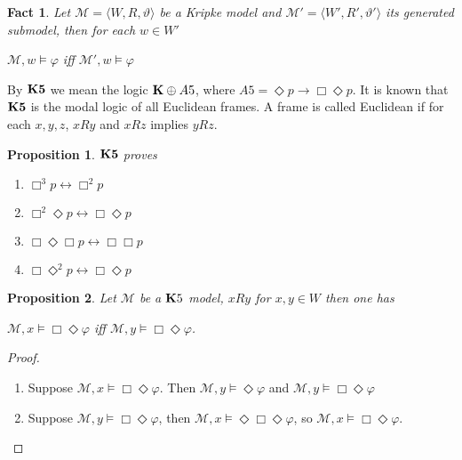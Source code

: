 \documentclass[a4paper]{article}
\theoremstyle{defin}
\theoremstyle{theorem}
\theoremstyle{prop}
\newtheorem{prop}{Proposition}
\theoremstyle{lemma}
\theoremstyle{fact}
\newtheorem{fact}{Fact}
\theoremstyle{ex}
\theoremstyle{col}
\begin{document}
\begin{fact}
  Let $\mathcal{M} = \langle W, R, \vartheta \rangle$ be a Kripke model and
  $\mathcal{M}' = \langle W', R', \vartheta' \rangle$ its generated submodel,
  then for each $w \in W'$
  \begin{center}
    $\mathcal{M}, w \models \varphi$ iff $\mathcal{M}', w \models \varphi$
  \end{center}
\end{fact}

By ${\bf K5}$ we mean the logic ${\bf K} \oplus {A5}$, where ${A5} = \Diamond p \to \Box \Diamond p$. It is known that ${\bf K5}$ is the modal logic of all Euclidean frames. A frame is called Euclidean if for each $x, y, z$, $x R y$ and $x R z$ implies $y R z$.

\begin{prop} \label{K5proves}
  ${\bf K5}$ proves
  \begin{enumerate}
    \item $\Box^3 p \leftrightarrow \Box^2 p$
    \item $\Box^2 \Diamond p \leftrightarrow \Box \Diamond p$
    \item $\Box \Diamond \Box p \leftrightarrow \Box \Box p$
    \item $\Box \Diamond^2 p \leftrightarrow \Box \Diamond p$
  \end{enumerate}
\end{prop}

\begin{prop} \label{k5useful}
  Let $\mathcal{M}$ be a ${\bf K}5$ model, $x R y$ for $x, y \in W$ then one has
  \begin{center}
    $\mathcal{M}, x \models \Box \Diamond \varphi$ iff $\mathcal{M}, y \models \Box \Diamond \varphi$.
  \end{center}
\end{prop}

\begin{proof}
$ $

  \begin{enumerate}
    \item Suppose $\mathcal{M}, x \models \Box \Diamond \varphi$. Then $\mathcal{M}, y \models \Diamond \varphi$ and $\mathcal{M}, y \models \Box \Diamond \varphi$
    \item Suppose $\mathcal{M}, y \models \Box \Diamond \varphi$, then $\mathcal{M}, x \models \Diamond \Box \Diamond \varphi$, so $\mathcal{M}, x \models \Box \Diamond \varphi$.
  \end{enumerate}
\end{proof}
\end{document}
